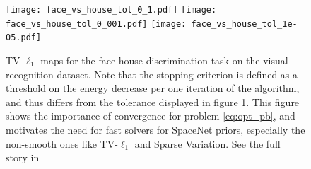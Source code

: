 \begin{figure}[!htb]
    \texttt{[image: face\_vs\_house\_tol\_0\_1.pdf]}%
\hfill%
\texttt{[image: face\_vs\_house\_tol\_0\_001.pdf]}%
\hfill%
\texttt{[image: face\_vs\_house\_tol\_1e-05.pdf]}%
%

\caption{TV-$\ell_1$ maps for the face-house discrimination task on
  the visual recognition dataset.
  Note that
  the stopping criterion is defined as a threshold on the energy
  decrease per one iteration of the algorithm, and thus differs from
  the tolerance displayed in figure \ref{Fig:benchmarks_prni}.  This figure shows
  the importance of convergence for problem \eqref{eq:opt_pb}, and motivates
  the need for fast solvers for SpaceNet priors, especially the non-smooth ones like TV-$\ell_1$ and Sparse Variation. See the full story in
  \citep{dohmatob2014benchmarking}}
  \label{Fig:benchmarks_prni}
\end{figure}

  

